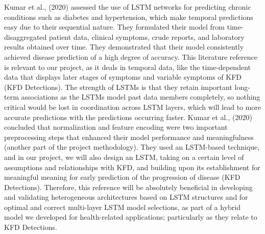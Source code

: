\documentclass[conference]{IEEEtran}
\begin{document}
\par\vspace{1em} 
Kumar et al., (2020) assessed the use of LSTM networks for predicting chronic conditions such as diabetes and hypertension, which make temporal predictions easy due to their sequential nature. They formulated their model from time-disaggregated patient data, clinical symptoms, crude reports, and laboratory results obtained over time. They demonstrated that their model consistently achieved disease prediction of a high degree of accuracy. This literature reference is relevant to our project, as it deals in temporal data, like the time-dependent data that displays later stages of symptoms and variable symptoms of KFD (KFD Detections). The strength of LSTMs is that they retain important long-term associations as the LSTMs model past data members completely, so nothing critical would be lost in coordination across LSTM layers, which will lead to more accurate predictions with the predictions occurring faster. Kumar et al., (2020) concluded that normalization and feature encoding were two important preprocessing steps that enhanced their model performance and meaningfulness (another part of the project methodology). They used an LSTM-based technique, and in our project, we will also design an LSTM, taking on a certain level of assumptions and relationships with KFD, and building upon its establishment for meaningful meaning for early prediction of the progression of disease (KFD Detections). Therefore, this reference will be absolutely beneficial in developing and validating heterogeneous architectures based on LSTM structures and for optimal and correct multi-layer LSTM model selections, as part of a hybrid model we developed for health-related applications; particularly as they relate to KFD Detections.
\par\vspace{1em}
\end{document}
